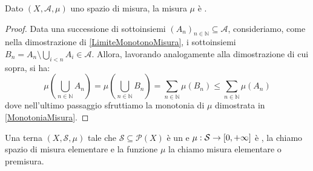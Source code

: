 \begin{remark}
	Dato $(X,\mathcal A,\mu)$ uno spazio di misura, la misura $\mu$ è \sigsubadd{}.
\end{remark}
\begin{proof}
	Data una successione di sottoinsiemi $(A_n)_{n\in\mathbb N}\subseteq \mathcal A$, consideriamo, come nella dimostrazione di \cref{LimiteMonotonoMisura}, i sottoinsiemi $B_n=A_n\setminus\bigcup_{i<n}A_i\in\mathcal A$.
	Allora, lavorando analogamente alla dimostrazione di cui sopra, si ha:
	\begin{equation*}
		\mu\left(\bigcup_{n\in\mathbb N} A_n\right)=\mu\left(\bigcup_{n\in\mathbb N} B_n\right)=
		\sum_{n\in\mathbb N} \mu(B_n)\le \sum_{n\in\mathbb N} \mu(A_n)
	\end{equation*}
	dove nell'ultimo passaggio sfruttiamo la monotonia di $\mu$ dimostrata in \cref{MonotoniaMisura}.
\end{proof}

\begin{definition}
	Una terna $(X,\mathcal S,\mu)$ tale che $\mathcal S\subseteq\mathcal P(X)$ è un \semiring{} e $\mu:\mathcal S\to [0,+\infty]$ è \sigadd{}, la chiamo spazio di misura elementare e la funzione $\mu$ la chiamo misura elementare o premisura.
\end{definition}

